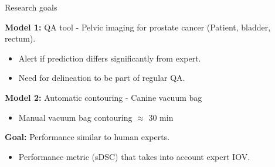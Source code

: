\documentclass[9pt]{beamer}
\begin{document}
\begin{frame}{Research goals}

\textbf{Model 1:} QA tool - Pelvic imaging for prostate cancer (Patient, bladder, rectum).
\begin{itemize}
\item Alert if prediction differs significantly from expert.
\item Need for delineation to be part of regular QA.\footnotemark[4]

\end{itemize}
\vspace{4mm}

\textbf{Model 2:} Automatic contouring - Canine vacuum bag
\begin{itemize}
\item Manual vacuum bag contouring $\approx$ 30 min
\end{itemize}
\vspace{3mm}

\textbf{Goal:} Performance similar to human experts.
\begin{itemize}
\item Performance metric (sDSC) that takes into account expert IOV.\footnotemark[3]
\end{itemize}
\end{frame}

\end{document}
